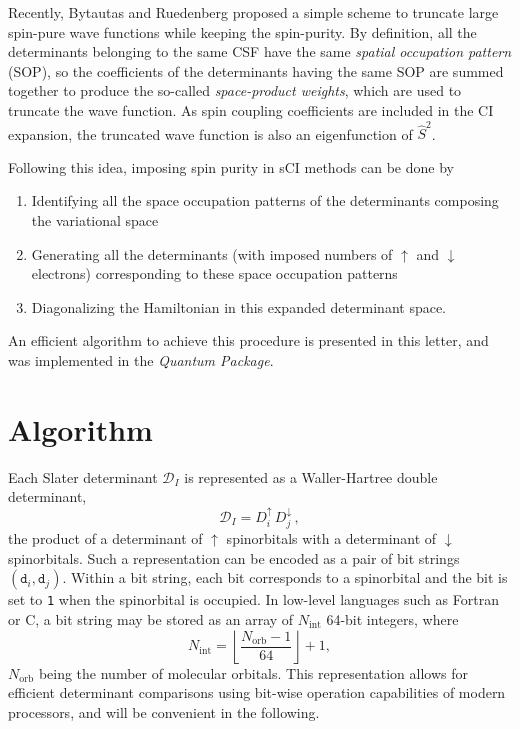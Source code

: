 \documentclass[aip,jcp,reprint,showkeys]{revtex4-1}
\newcommand{\stwo}{\hat{S}^2}
\newcommand{\md}{\mathtt{d}}
\newcommand{\mD}{\mathcal{D}}
\newcommand{\up}{\uparrow}
\newcommand{\dn}{\downarrow}
\newcommand{\Nint}{{N_\text{int}}}
\newcommand{\Norb}{{N_\text{orb}}}
\newcommand{\sop}{SOP}
\newcommand{\one}{{\texttt{1}}}
\begin{document}
Recently, Bytautas and Ruedenberg proposed a simple scheme to truncate large
spin-pure wave functions while keeping the spin-purity.\cite{Bytautas_2007}
By definition, all the determinants belonging to the same CSF have the same
\emph{spatial occupation pattern} (\sop), so the
coefficients of the determinants having the same {\sop}
are summed together to produce the so-called \emph{space-product
weights}, which are used to truncate the wave function. As spin coupling
coefficients are included in the CI expansion, the truncated wave function is
also an eigenfunction of $\stwo$.

Following this idea, imposing spin purity in sCI methods can be done by 
\begin{enumerate}
\item Identifying all the space occupation patterns of the determinants composing
      the variational space
\item Generating all the determinants (with imposed numbers of $\up$ and
      $\dn$ electrons) corresponding to these space occupation patterns
\item Diagonalizing the Hamiltonian in this expanded determinant space.
\end{enumerate}
An efficient algorithm to achieve this procedure is presented in this letter,
and was implemented in the \emph{Quantum Package}.\cite{qp}

\section{Algorithm}

Each Slater determinant $\mD_I$ is represented as a Waller-Hartree double
determinant,\cite{Pauncz_1989}
\begin{equation}
 \label{eq:di}
 \mD_I = D_i^\up \, D_j^\dn\, ,
\end{equation}
the product of a determinant of
$\up$ spinorbitals with a determinant of $\dn$ spinorbitals.
Such a representation can be encoded as a pair of bit strings $(\md_i,\md_j)$.
Within a bit string,
each bit corresponds to a spinorbital and the bit is set to \one{} when the
spinorbital is occupied. In low-level languages such as Fortran or C, a bit
string may be stored as an array of $\Nint$ 64-bit integers, where 
\begin{equation}
  \Nint = \left \lfloor \frac{\Norb-1}{64} \right \rfloor + 1,
\end{equation}
$\Norb$ being the number of molecular orbitals.
This representation
allows for efficient determinant comparisons using bit-wise operation 
capabilities of modern processors,\cite{Scemama_2013} and will be convenient
in the following.
\end{document}
